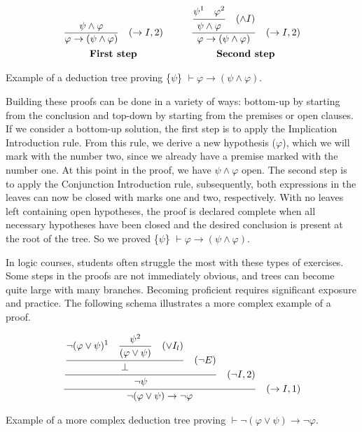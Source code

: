 \begin{table}[h!]
    \[
    \begin{array}{c@{\hspace{1cm}}c}
            \frac{\displaystyle \psi \land \varphi\strut}{\displaystyle \varphi \to (\psi \land \varphi)\strut} \quad (\to I, 2) &
            \frac{\displaystyle\frac{\displaystyle \psi^1 \quad \varphi^2\strut}{\displaystyle \psi \land \varphi\strut}\quad (\land I)\strut}{\displaystyle \varphi \to (\psi \land \varphi)\strut} \quad (\to I, 2)\\[10pt]
            \textbf{First step} & \textbf{Second step} \\
    \end{array}
      \]
    \caption{Example of a deduction tree proving \{\(\psi\)\} \( \vdash \varphi \to (\psi \land \varphi) \).}
    \label{tab:proof-tree-part2}
\end{table}

Building these proofs can be done in a variety of ways: bottom-up by starting from the conclusion and top-down by starting from the premises or open clauses. If we consider a bottom-up solution, the first step is to apply the Implication Introduction rule. From this rule, we derive a new hypothesis (\(\varphi\)), which we will mark with the number two, since we already have a premise marked with the number one. At this point in the proof, we have \(\displaystyle \psi \land \varphi\) open. The second step is to apply the Conjunction Introduction rule, subsequently, both expressions in the leaves can now be closed with marks one and two, respectively. With no leaves left containing open hypotheses, the proof is declared complete when all necessary hypotheses have been closed and the desired conclusion is present at the root of the tree. So we proved \{\(\psi\)\} \( \vdash \varphi \to (\psi \land \varphi) \).

In logic courses, students often struggle the most with these types of exercises. Some steps in the proofs are not immediately obvious, and trees can become quite large with many branches. Becoming proficient requires significant exposure and practice. The following schema illustrates a more complex example of a proof.
\begin{table}[h!]
    \centering
    \[
    \frac{\displaystyle \frac{\displaystyle \frac{
    \displaystyle \neg (\varphi \lor \psi)^1 \quad \displaystyle \frac{\psi^2}{(\varphi \lor \psi) \strut} \quad (\lor I_l) \strut}
    {\displaystyle \bot \strut} \quad (\displaystyle \neg E)\strut} {\displaystyle \neg \psi \strut} \quad (\neg I, 2) \strut}
    {\neg (\varphi \lor \psi) \to \neg \varphi \strut} \quad (\to I, 1)
    \]
    \caption{Example of a more complex deduction tree proving \( \vdash \neg (\varphi \lor \psi) \to \neg \varphi \).}
    \label{tab:proof-tree1}
\end{table}
    

